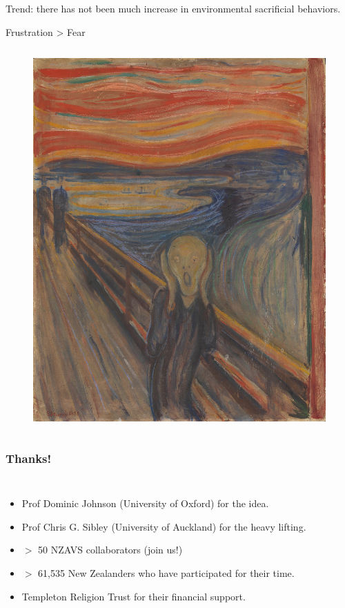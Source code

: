 \documentclass{beamer}
\begin{document}
\begin{frame}{Trend: there has not been much increase in environmental sacrificial behaviors.}
\begin{frame}{Frustration >  Fear}
\begin{columns}
\begin{figure}
\includegraphics[width=1.05\textwidth,height=1.05\textheight,keepaspectratio]{Figures/Munchjpg.jpg}
\end{figure}
\end{columns}
\end{frame}



\begin{frame}
\frametitle{Thanks!}

\begin{columns}

\begin{itemize}
\item Prof Dominic Johnson (University of Oxford) for the idea.
\item Prof Chris G. Sibley (University of Auckland) for the heavy lifting.
\item $>$ 50 NZAVS collaborators (join us!)
\item $>$ 61,535 New Zealanders who have participated for their time.
\item Templeton Religion Trust for their financial support.
\end{itemize}


\end{columns}
\end{frame}
\end{frame}
\end{document}
